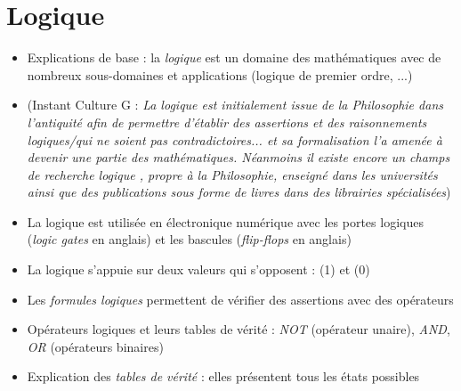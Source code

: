 \documentclass[11pt,a4paper]{article}
\begin{document}

\section{Logique}

\bigskip

\begin{itemize}
\item Explications de base : la \textit{logique} est un domaine des mathématiques avec de nombreux sous-domaines et applications (logique de premier ordre, ...)
\item (Instant Culture G : \textit{La logique est initialement issue de la Philosophie dans l'antiquité afin de permettre d'établir des assertions et des raisonnements logiques/qui ne soient pas contradictoires... et sa formalisation l'a amenée à devenir une partie des mathématiques. Néanmoins il existe encore un champs de recherche \og logique \fg{}, propre à la Philosophie, enseigné dans les universités ainsi que des publications sous forme de livres dans des librairies spécialisées})
\item La logique est utilisée en électronique numérique avec les portes logiques (\textit{logic gates} en anglais) et les bascules (\textit{flip-flops} en anglais)
\end{itemize}

\begin{itemize}
\item La logique s'appuie sur deux valeurs qui s'opposent :  (1) et  (0)
\item Les \textit{formules logiques} permettent de vérifier des assertions avec des opérateurs
\item Opérateurs logiques et leurs tables de vérité : \textit{NOT} (opérateur unaire), \textit{AND}, \textit{OR} (opérateurs binaires)
\item Explication des \textit{tables de vérité} : elles présentent tous les états possibles
\end{itemize}

\bigskip
\end{document}
